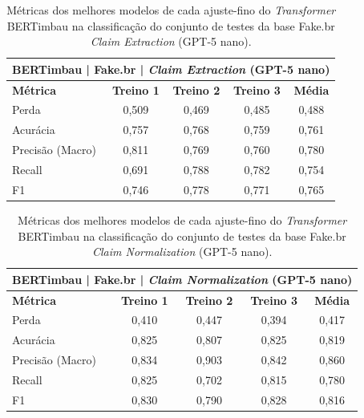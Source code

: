 \begin{table}[!htbp]
\centering
\begin{tabular}{l*4c}
\toprule
\multicolumn{5}{c}{\textbf{BERTimbau | Fake.br | \textit{Claim Extraction} (GPT-5 nano)}} \\ 
\midrule
\textbf{Métrica} & \textbf{Treino 1} & \textbf{Treino 2} & \textbf{Treino 3} & \textbf{Média} \\ 
\midrule
Perda & 0,509 & 0,469 & 0,485 & 0,488 \\ 
Acurácia & 0,757 & 0,768 & 0,759 & 0,761 \\ 
Precisão (Macro) & 0,811 & 0,769 & 0,760 & 0,780 \\ 
Recall & 0,691 & 0,788 & 0,782 & 0,754 \\ 
F1 & 0,746 & 0,778 & 0,771 & 0,765 \\ 
\bottomrule
\end{tabular}
\caption{Métricas dos melhores modelos de cada ajuste-fino do \textit{Transformer} BERTimbau na classificação do conjunto de testes da base Fake.br \textit{Claim Extraction} (GPT-5 nano).}
\end{table}

\begin{table}[!htbp]
\centering
\begin{tabular}{l*4c}
\toprule
\multicolumn{5}{c}{\textbf{BERTimbau | Fake.br | \textit{Claim Normalization} (GPT-5 nano)}} \\ 
\midrule
\textbf{Métrica} & \textbf{Treino 1} & \textbf{Treino 2} & \textbf{Treino 3} & \textbf{Média} \\ 
\midrule
Perda & 0,410 & 0,447 & 0,394 & 0,417 \\ 
Acurácia & 0,825 & 0,807 & 0,825 & 0,819 \\ 
Precisão (Macro) & 0,834 & 0,903 & 0,842 & 0,860 \\ 
Recall & 0,825 & 0,702 & 0,815 & 0,780 \\ 
F1 & 0,830 & 0,790 & 0,828 & 0,816 \\ 
\bottomrule
\end{tabular}
\caption{Métricas dos melhores modelos de cada ajuste-fino do \textit{Transformer} BERTimbau na classificação do conjunto de testes da base Fake.br \textit{Claim Normalization} (GPT-5 nano).}
\end{table}
